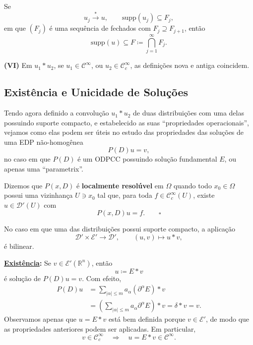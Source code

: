 \documentclass[../distribution_theory_notes.tex]{subfiles}
\begin{document}
\begin{lemma*}
	Se
	\[
		u_{j}\stackrel{*}{\longrightarrow}u,
		\qquad \mathrm{supp}(u_{j})\subseteq F_{j},
	\]
	em que \((F_{j})\) é uma sequência de fechados com \(F_{j}\supseteq F_{j+1}\), então
	\[
		\mathrm{supp}(u)\subseteq F
		\coloneqq\bigcap_{j=1}^{\infty}F_{j}.
	\]
\end{lemma*}

\medskip
\noindent\textbf{(VI)} Em \(u_{1}*u_{2}\), se \(u_{1}\in\mathcal{C}^{\infty}\), ou \(u_{2}\in\mathcal{C}_{c}^{\infty}\), as definições nova e antiga coincidem.

\subsection{Existência e Unicidade de Soluções}
Tendo agora definido a convolução \(u_{1}*u_{2}\) de duas distribuições com uma delas possuindo suporte compacto, e estabelecido as suas ``propriedades operacionais'', vejamos como elas podem ser úteis no estudo das propriedades das soluções de uma EDP não-homogênea
\[
	P(D)u=v,
\]
no caso em que \(P(D)\) é um ODPCC possuindo solução fundamental \(E\), ou apenas uma ``parametrix''.

\begin{def*}
	Dizemos que \(P(x,D)\) é \textbf{localmente resolúvel} em \(\Omega\) quando todo \(x_{0}\in\Omega\) possui uma vizinhança \(U\ni x_{0}\) tal que, para toda \(f\in\mathcal{C}_{c}^{\infty}(U)\), existe \(u\in\mathcal{D}'(U)\) com
	\[
		P(x,D)u=f.\qquad \square
	\]
\end{def*}

No caso em que uma das distribuições possui suporte compacto, a aplicação
\[
	\mathcal{D}'\times\mathcal{E}'\longrightarrow\mathcal{D}',
	\qquad (u,v)\longmapsto u*v,
\]
é bilinear.

\noindent\textbf{\underline{Existência}:} Se \(v\in\mathcal{E}'(\mathbb{R}^{n})\), então
\[
	u\coloneqq E*v
\]
é solução de \(P(D)u=v\). Com efeito,
\begin{align*}
	P(D)u
	 & =\sum_{|\alpha|\leq m}a_{\alpha}(\partial^{\alpha}E)*v            \\
	 & =\left(\sum_{|\alpha|\leq m}a_{\alpha}\partial^{\alpha}E\right)*v
	=\delta*v=v.
\end{align*}
Observamos apenas que \(u=E*v\) está bem definida porque \(v\in\mathcal{E}'\), de modo que as propriedades anteriores podem ser aplicadas. Em particular,
\[
	v\in\mathcal{C}_{c}^{\infty}
	\quad\Longrightarrow\quad
	u=E*v\in\mathcal{C}^{\infty}.
\]
\end{document}

